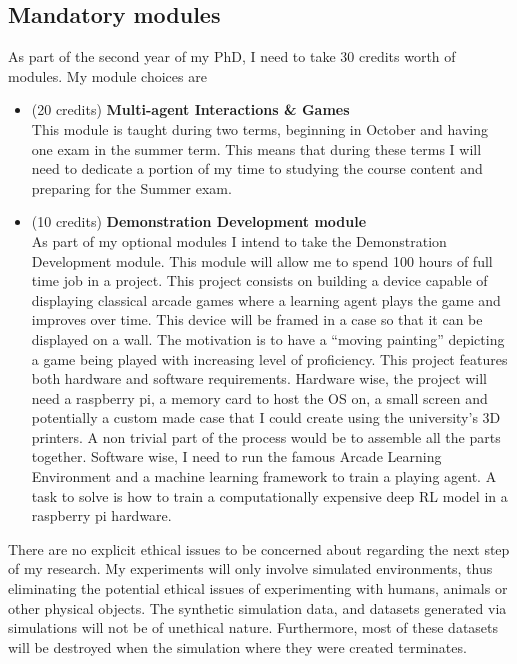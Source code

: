 \documentclass{article}
\begin{document}
\subsection{Mandatory modules}
As part of the second year of my PhD, I need to take 30 credits worth of modules. My module choices are 
\begin{itemize}
    \item (20 credits) \textbf{Multi-agent Interactions \& Games} \\
        This module is taught during two terms, beginning in October and having one exam in the summer term. This means that during these terms I will need to dedicate a portion of my time to studying the course content and preparing for the Summer exam.
    \item (10 credits) \textbf{Demonstration Development module} \\
        As part of my optional modules I intend to take the Demonstration Development module. This module will allow me to spend 100 hours of full time job in a project. This project consists on building a device capable of displaying classical arcade games where a learning agent plays the game and improves over time. This device will be framed in a case so that it can be displayed on a wall. The motivation is to have a “moving painting” depicting a game being played with increasing level of proficiency. This project features both hardware and software requirements. Hardware wise, the project will need a raspberry pi, a memory card to host the OS on, a small screen and potentially a custom made case that I could create using the university's 3D printers. A non trivial part of the process would be to assemble all the parts together. Software wise, I need to run the famous Arcade Learning Environment and a machine learning framework to train a playing agent. A task to solve is how to train a computationally expensive deep RL model in a raspberry pi hardware. 
\end{itemize}

There are no explicit ethical issues to be concerned about regarding the next step of my research. My experiments will only involve simulated environments, thus eliminating the potential ethical issues of experimenting with humans, animals or other physical objects. The synthetic simulation data, and datasets generated via simulations will not be of unethical nature. Furthermore, most of these datasets will be destroyed when the simulation where they were created terminates.


%
%
\end{document}
